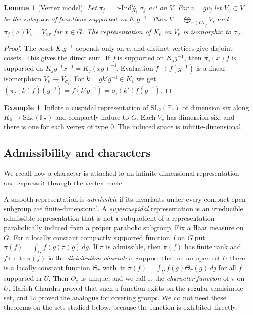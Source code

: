 \documentclass[12pt,letterpaper]{article}
\numberwithin{equation}{section}
\newtheorem{lemma}[theorem]{Lemma}
\theoremstyle{definition}
\newtheorem{example}[theorem]{Example}
\theoremstyle{remark}
\newcommand{\cInd}{\operatorname{c-Ind}}
\newcommand{\tr}{\operatorname{tr}}
\begin{document}
\begin{lemma}[Vertex model]\label{lem:model}
Let $\pi_j=\cInd_{K_j}^G\sigma_j$ act on $V$. For $v=gv_j$ let $V_v\subset V$ be the subspace of functions supported on $K_jg^{-1}$. Then $V=\bigoplus_{v\in Gv_j}V_v$ and $\pi_j(x)V_v=V_{xv}$ for $x\in G$. The representation of $K_v$ on $V_v$ is isomorphic to $\sigma_v$.
\end{lemma}
\begin{proof}
The coset $K_jg^{-1}$ depends only on $v$, and distinct vertices give disjoint cosets. This gives the direct sum. If $f$ is supported on $K_jg^{-1}$, then $\pi_j(x)f$ is supported on $K_jg^{-1}x^{-1}=K_j(xg)^{-1}$. Evaluation $f\mapsto f(g^{-1})$ is a linear isomorphism $V_v\to V_{\sigma_j}$. For $k=gk'g^{-1}\in K_v$ we get $(\pi_j(k)f)(g^{-1})=f(k'g^{-1})=\sigma_j(k')f(g^{-1})$.
\end{proof}

\begin{example}
Inflate a cuspidal representation of $\mathrm{SL}_2(\mathbb F_7)$ of dimension six along $K_0\to\mathrm{SL}_2(\mathbb F_7)$ and compactly induce to $G$. Each $V_v$ has dimension six, and there is one for each vertex of type $0$. The induced space is infinite-dimensional.
\end{example}

\subsection*{Admissibility and characters}
We recall how a character is attached to an infinite-dimensional representation and express it through the vertex model.

A smooth representation is \emph{admissible} if its invariants under every compact open subgroup are finite-dimensional. A \emph{supercuspidal} representation is an irreducible admissible representation that is not a subquotient of a representation parabolically induced from a proper parabolic subgroup. Fix a Haar measure on $G$. For a locally constant compactly supported function $f$ on $G$ put $\pi(f)=\int_Gf(g)\pi(g)\,dg$. If $\pi$ is admissible, then $\pi(f)$ has finite rank and $f\mapsto\tr\pi(f)$ is the \emph{distribution character}. Suppose that on an open set $U$ there is a locally constant function $\Theta_\pi$ with $\tr\pi(f)=\int_Uf(g)\Theta_\pi(g)\,dg$ for all $f$ supported in $U$. Then $\Theta_\pi$ is unique, and we call it the \emph{character function} of $\pi$ on $U$. Harish-Chandra proved that such a function exists on the regular semisimple set, and Li \cite{Li12} proved the analogue for covering groups. We do not need these theorems on the sets studied below, because the function is exhibited directly.
\end{document}
